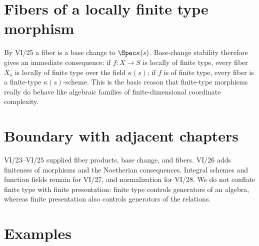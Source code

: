 \section{Fibers of a locally finite type morphism}
By VI/25 a fiber is a base change to $\Spec\kappa(s)$.  Base-change stability therefore gives an immediate
consequence: if $f:X\to S$ is locally of finite type, every fiber $X_s$ is locally of finite type over the field
$\kappa(s)$; if $f$ is of finite type, every fiber is a finite-type $\kappa(s)$-scheme.  This is the basic reason
that finite-type morphisms really do behave like algebraic families of finite-dimensional coordinate complexity.

\section{Boundary with adjacent chapters}
VI/23--VI/25 supplied fiber products, base change, and fibers.  VI/26 adds finiteness of morphisms and the
Noetherian consequences.  Integral schemes and function fields remain for VI/27, and normalization for VI/28.
We do not conflate finite type with finite presentation: finite type controls generators of an algebra, whereas
finite presentation also controls generators of the relations.

\section{Examples}



